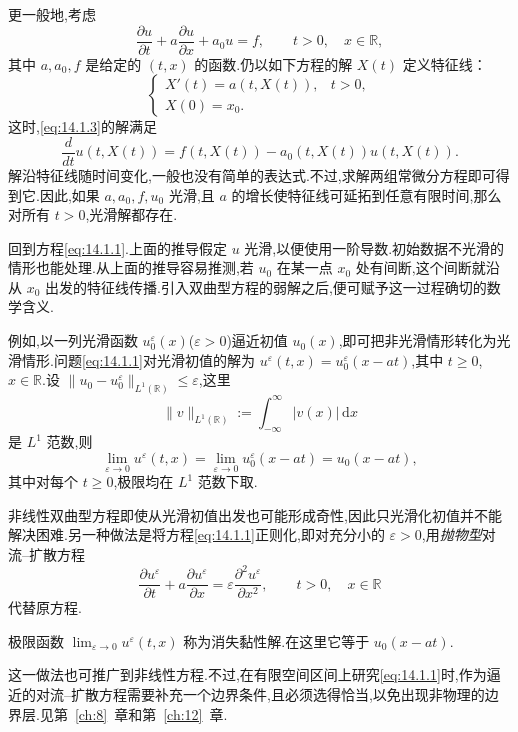 更一般地,考虑
\begin{equation}\label{eq:14.1.3}
  \frac{\partial u}{\partial t}+a\frac{\partial u}{\partial x}+a_0u=f,
     \qquad t>0,\quad x\in\mathbb R,
\end{equation}
其中 \(a,a_0,f\) 是给定的 \((t,x)\) 的函数.仍以如下方程的解 \(X(t)\) 定义特征线：
\begin{equation}\label{eq:14.1.4}
  \begin{cases}
    X'(t)=a(t,X(t)), & t>0,\\
    X(0)=x_0.
  \end{cases}
\end{equation}
这时,\eqref{eq:14.1.3}的解满足
\[
  \frac{d}{dt}u(t,X(t))=f(t,X(t))-a_0(t,X(t))u(t,X(t)).
\]
解沿特征线随时间变化,一般也没有简单的表达式.不过,求解两组常微分方程即可得到它.因此,如果 \(a,a_0,f,u_0\) 光滑,且 \(a\) 的增长使特征线可延拓到任意有限时间,那么对所有 \(t>0\),光滑解都存在.

回到方程\eqref{eq:14.1.1}.上面的推导假定 \(u\) 光滑,以便使用一阶导数.初始数据不光滑的情形也能处理.从上面的推导容易推测,若 \(u_0\) 在某一点 \(x_0\) 处有间断,这个间断就沿从 \(x_0\) 出发的特征线传播.引入双曲型方程的弱解之后,便可赋予这一过程确切的数学含义.

例如,以一列光滑函数 \(u_0^\varepsilon(x)\)(\(\varepsilon>0\))逼近初值 \(u_0(x)\),即可把非光滑情形转化为光滑情形.问题\eqref{eq:14.1.1}对光滑初值的解为 \(u^\varepsilon(t,x)=u_0^\varepsilon(x-at)\),其中 \(t\ge0\),\(x\in\mathbb R\).设 \(\|u_0-u_0^\varepsilon\|_{L^1(\mathbb R)}\le\varepsilon\),这里
\begin{equation}\label{eq:14.1.5}
  \|v\|_{L^1(\mathbb R)}:=\int_{-\infty}^{\infty}|v(x)|\,\mathrm dx
\end{equation}
是 \(L^1\) 范数,则
\[
  \lim_{\varepsilon\to0}u^\varepsilon(t,x)
    =\lim_{\varepsilon\to0}u_0^\varepsilon(x-at)=u_0(x-at),
\]
其中对每个 \(t\ge0\),极限均在 \(L^1\) 范数下取.

非线性双曲型方程即使从光滑初值出发也可能形成奇性,因此只光滑化初值并不能解决困难.另一种做法是将方程\eqref{eq:14.1.1}正则化,即对充分小的 \(\varepsilon>0\),用\emph{抛物型}对流--扩散方程
\[
  \frac{\partial u^\varepsilon}{\partial t}
    +a\frac{\partial u^\varepsilon}{\partial x}
    =\varepsilon\frac{\partial^2u^\varepsilon}{\partial x^2},
    \qquad t>0,\quad x\in\mathbb R
\]
代替原方程.
\begin{definition*}
极限函数 \(\lim_{\varepsilon\to0}u^\varepsilon(t,x)\) 称为{\heiti 消失黏性解}.在这里它等于 \(u_0(x-at)\).
\end{definition*}
这一做法也可推广到非线性方程.不过,在有限空间区间上研究\eqref{eq:14.1.1}时,作为逼近的对流--扩散方程需要补充一个边界条件,且必须选得恰当,以免出现非物理的边界层.见第~\ref{ch:8}~章和第~\ref{ch:12}~章.

